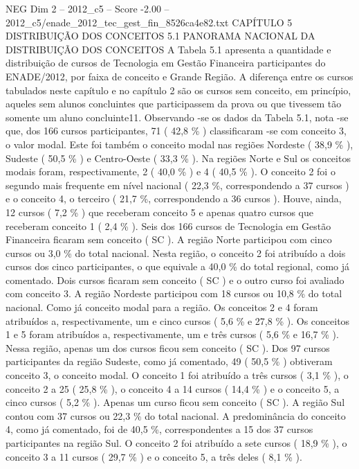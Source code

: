 \begin{textsample}{NEG Dim 2 – 2012\_c5 – Score -2.00 – 2012\_c5/enade\_2012\_tec\_gest\_fin\_8526ca4e82.txt}  \label{ex:f2_neg_076}
CAPÍTULO 5 DISTRIBUIÇÃO DOS CONCEITOS 5.1 PANORAMA NACIONAL DA DISTRIBUIÇÃO DOS CONCEITOS A Tabela 5.1 apresenta a quantidade e distribuição de cursos de Tecnologia em Gestão Financeira participantes do ENADE/2012, por faixa de conceito e Grande Região.
A diferença entre os cursos tabulados neste capítulo e no capítulo 2 são os cursos sem conceito, em princípio, aqueles sem alunos concluintes que participassem da prova ou que tivessem tão somente um aluno concluinte11.
Observando -se os dados da Tabela 5.1, nota -se que, dos 166 cursos participantes, 71 ( 42,8 \% ) classificaram -se com conceito 3, o valor modal.
Este foi também o conceito modal nas regiões Nordeste ( 38,9 \% ), Sudeste ( 50,5 \% ) e Centro-Oeste ( 33,3 \% ).
Na regiões Norte e Sul os conceitos modais foram, respectivamente, 2 ( 40,0 \% ) e 4 ( 40,5 \% ).
O conceito 2 foi o segundo mais frequente em nível nacional ( 22,3 \%, correspondendo a 37 cursos ) e o conceito 4, o terceiro ( 21,7 \%, correspondendo a 36 cursos ).
Houve, ainda, 12 cursos ( 7,2 \% ) que receberam conceito 5 e apenas quatro cursos que receberam conceito 1 ( 2,4 \% ).
Seis dos 166 cursos de Tecnologia em Gestão Financeira ficaram sem conceito ( SC ).
A região Norte participou com cinco cursos ou 3,0 \% do total nacional.
Nesta região, o conceito 2 foi atribuído a dois cursos dos cinco participantes, o que equivale a 40,0 \% do total regional, como já comentado.
Dois cursos ficaram sem conceito ( SC ) e o outro curso foi avaliado com conceito 3.
A região Nordeste participou com 18 cursos ou 10,8 \% do total nacional.
Como já conceito modal para a região.
Os conceitos 2 e 4 foram atribuídos a, respectivamente, um e cinco cursos ( 5,6 \% e 27,8 \% ).
Os conceitos 1 e 5 foram atribuídos a, respectivamente, um e três cursos ( 5,6 \% e 16,7 \% ).
Nessa região, apenas um dos cursos ficou sem conceito ( SC ).
Dos 97 cursos participantes da região Sudeste, como já comentado, 49 ( 50,5 \% ) obtiveram conceito 3, o conceito modal.
O conceito 1 foi atribuído a três cursos ( 3,1 \% ), o conceito 2 a 25 ( 25,8 \% ), o conceito 4 a 14 cursos ( 14,4 \% ) e o conceito 5, a cinco cursos ( 5,2 \% ).
Apenas um curso ficou sem conceito ( SC ).
A região Sul contou com 37 cursos ou 22,3 \% do total nacional.
A predominância do conceito 4, como já comentado, foi de 40,5 \%, correspondentes a 15 dos 37 cursos participantes na região Sul.
O conceito 2 foi atribuído a sete cursos ( 18,9 \% ), o conceito 3 a 11 cursos ( 29,7 \% ) e o conceito 5, a três deles ( 8,1 \% ).

\end{textsample}
